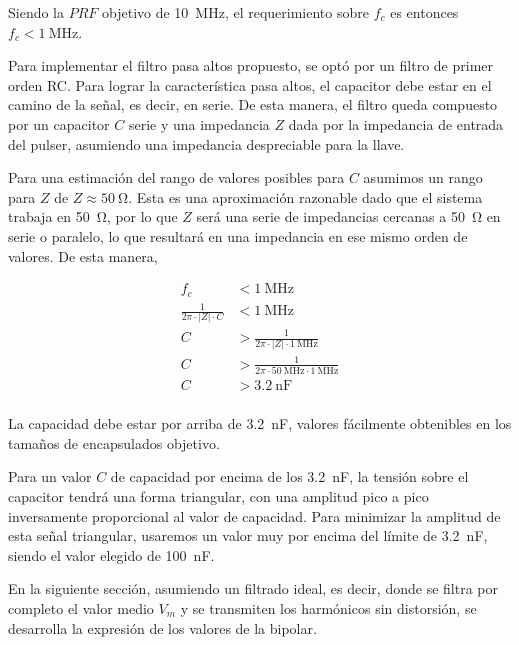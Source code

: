 Siendo la $PRF$ objetivo de \qty{10}{\mega\hertz}, el requerimiento sobre $f_c$
es entonces $f_c < \qty{1}{\mega\hertz}$.

Para implementar el filtro pasa altos propuesto, se optó por un filtro de primer
orden RC. Para lograr la característica pasa altos, el capacitor debe estar en
el camino de la señal, es decir, en serie. De esta manera, el filtro queda
compuesto por un capacitor $C$ serie y una impedancia $Z$ dada por la impedancia
de entrada del pulser, asumiendo una impedancia despreciable para la llave.

Para una estimación del rango de valores posibles para $C$ asumimos un rango
para $Z$ de $ Z \approx \qty{50}{\ohm}$. Esta es una aproximación razonable dado
que el sistema trabaja en \qty{50}{\ohm}, por lo que $Z$ será una serie de
impedancias cercanas a \qty{50}{\ohm} en serie o paralelo, lo que resultará en
una impedancia en ese mismo orden de valores. De esta manera,

\begin{equation}
    \begin{aligned}
        f_c &< \qty{1}{\mega\hertz} \\
        \frac{1}{2\pi \cdot |Z| \cdot C} &< \qty{1}{\mega\hertz} \\
        C &> \frac{1}{2\pi \cdot |Z| \cdot \qty{1}{\mega\hertz}} \\
        C &> \frac{1}{2\pi \cdot \qty{50}{\mega\hertz} \cdot \qty{1}{\mega\hertz}} \\
        C &> \qty{3.2}{\nano\farad} \\
    \end{aligned}
\end{equation}

La capacidad debe estar por arriba de \qty{3.2}{\nano\farad}, valores fácilmente
obtenibles en los tamaños de encapsulados objetivo.

Para un valor $C$ de capacidad por encima de los \qty{3.2}{\nano\farad}, la
tensión sobre el capacitor tendrá una forma triangular, con una amplitud pico a
pico inversamente proporcional al valor de capacidad. Para minimizar la amplitud
de esta señal triangular, usaremos un valor muy por encima del límite de
\qty{3.2}{\nano\farad}, siendo el valor elegido de \qty{100}{\nano\farad}.

En la siguiente sección, asumiendo un filtrado ideal, es decir, donde se filtra
por completo el valor medio $V_m$ y se transmiten los harmónicos sin distorsión,
se desarrolla la expresión de los valores de la bipolar.

